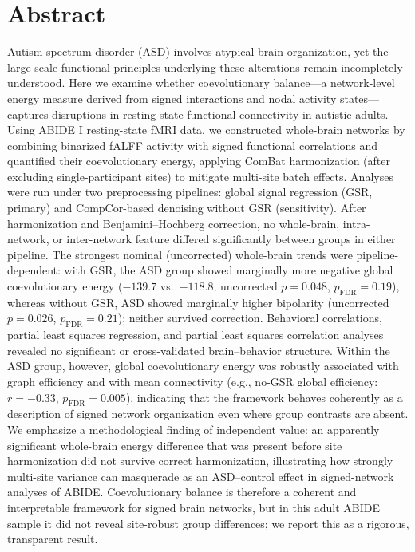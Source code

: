 \documentclass[10pt,letterpaper]{article}
\begin{document}
\section*{Abstract}
Autism spectrum disorder (ASD) involves atypical brain organization, yet the large-scale functional
principles underlying these alterations remain incompletely understood. Here we examine whether
coevolutionary balance---a network-level energy measure derived from signed interactions and nodal
activity states---captures disruptions in resting-state functional connectivity in autistic adults.
Using ABIDE I resting-state fMRI data, we constructed whole-brain networks by combining binarized
fALFF activity with signed functional correlations and quantified their coevolutionary energy,
applying ComBat harmonization (after excluding single-participant sites) to mitigate multi-site
batch effects. Analyses were run under two preprocessing pipelines: global signal regression (GSR,
primary) and CompCor-based denoising without GSR (sensitivity). After harmonization and
Benjamini--Hochberg correction, no whole-brain, intra-network, or inter-network feature differed
significantly between groups in either pipeline. The strongest nominal (uncorrected) whole-brain
trends were pipeline-dependent: with GSR, the ASD group showed marginally more negative global
coevolutionary energy ($-139.7$ vs.\ $-118.8$; uncorrected $p = 0.048$, $p_{\mathrm{FDR}} = 0.19$),
whereas without GSR, ASD showed marginally higher bipolarity (uncorrected $p = 0.026$,
$p_{\mathrm{FDR}} = 0.21$); neither survived correction. Behavioral correlations, partial
least squares regression, and partial least squares correlation analyses revealed no significant or
cross-validated brain--behavior structure. Within the ASD group, however, global coevolutionary
energy was robustly associated with graph efficiency and with mean connectivity (e.g., no-GSR global
efficiency: $r = -0.33$, $p_{\mathrm{FDR}} = 0.005$), indicating that the framework behaves
coherently as a description of signed network organization even where group contrasts are absent.
We emphasize a methodological finding of independent value: an apparently significant whole-brain
energy difference that was present before site harmonization did not survive correct harmonization,
illustrating how strongly multi-site variance can masquerade as an ASD--control effect in
signed-network analyses of ABIDE. Coevolutionary balance is therefore a coherent and interpretable
framework for signed brain networks, but in this adult ABIDE sample it did not reveal site-robust
group differences; we report this as a rigorous, transparent result.
\end{document}
